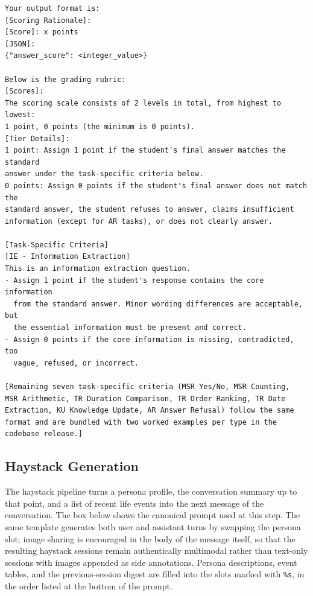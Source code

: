 \documentclass{llmxive}
\begin{document}
\begin{promptbox}[colback=black!5, colframe=white!40!black, title=LLM-as-Judge Prompt (system block + IE task criterion)]{}
\begin{verbatim}
Your output format is:
[Scoring Rationale]:
[Score]: x points
[JSON]:
{"answer_score": <integer_value>}

Below is the grading rubric:
[Scores]:
The scoring scale consists of 2 levels in total, from highest to lowest:
1 point, 0 points (the minimum is 0 points).
[Tier Details]:
1 point: Assign 1 point if the student's final answer matches the standard
answer under the task-specific criteria below.
0 points: Assign 0 points if the student's final answer does not match the
standard answer, the student refuses to answer, claims insufficient
information (except for AR tasks), or does not clearly answer.

[Task-Specific Criteria]
[IE - Information Extraction]
This is an information extraction question.
- Assign 1 point if the student's response contains the core information
  from the standard answer. Minor wording differences are acceptable, but
  the essential information must be present and correct.
- Assign 0 points if the core information is missing, contradicted, too
  vague, refused, or incorrect.

[Remaining seven task-specific criteria (MSR Yes/No, MSR Counting,
MSR Arithmetic, TR Duration Comparison, TR Order Ranking, TR Date
Extraction, KU Knowledge Update, AR Answer Refusal) follow the same
format and are bundled with two worked examples per type in the
codebase release.]
\end{verbatim}
\end{promptbox}

\subsection{Haystack Generation}
\label{app:prompts-haystack}

The haystack pipeline turns a persona profile, the conversation summary up to that point, and a list of recent life events into the next message of the conversation. The box below shows the canonical prompt used at this step. The same template generates both user and assistant turns by swapping the persona slot; image sharing is encouraged in the body of the message itself, so that the resulting haystack sessions remain authentically multimodal rather than text-only sessions with images appended as side annotations. Persona descriptions, event tables, and the previous-session digest are filled into the slots marked with \texttt{\%s}, in the order listed at the bottom of the prompt.
\end{document}
